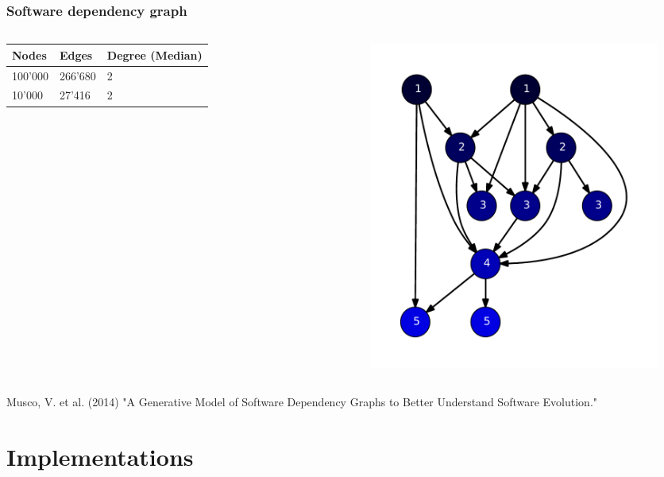 \begin{frame}
\frametitle{Software dependency graph}
\begin{columns}[c]
 \begin{tabular}{p{1cm}p{1cm}p{1.5cm}}
  Nodes    & Edges   & Degree (Median)\\\hline
  100'000  & 266'680 & 2\\
  10'000   & 27'416  & 2
 \end{tabular}
 \begin{figure}[!hbp]
    \includegraphics[height=0.7\textheight]{img/software10.pdf}
 \end{figure}

\end{columns}


{\color{gray}\tiny Musco, V. et al. (2014) "A Generative Model of Software Dependency Graphs to Better Understand Software Evolution."}
\end{frame}


\section{Implementations}


